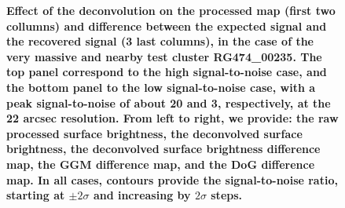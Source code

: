 \documentclass[twocolumn,traditabstract]{aa}
\begin{document}
\begin{figure}[h]
\caption{\footnotesize{{\bf Effect of the deconvolution on the processed map (first two collumns) and difference between the expected signal and the recovered signal (3 last columns), in the case of the very massive and nearby test cluster RG474\_00235. The top panel correspond to the high signal-to-noise case, and the bottom panel to the low signal-to-noise case, with a peak signal-to-noise of about 20 and 3, respectively, at the 22 arcsec resolution. From left to right, we provide: the raw processed surface brightness, the deconvolved surface brightness, the deconvolved surface brightness difference map, the GGM difference map, and the DoG difference map. In all cases, contours provide the signal-to-noise ratio, starting at $\pm 2 \sigma$ and increasing by $2 \sigma$ steps.}}}
\label{fig:transfer_function_effect}
\end{figure}

\end{document}
